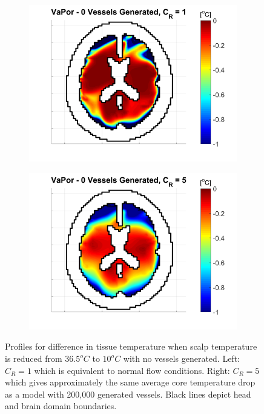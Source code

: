 \documentclass[11pt,english,a4paper,twoside,openright]{report}
\begin{document}
{{{{{{{\begin{figure}[h]
	\centering
	\begin{subfigure}[b]{0.49\textwidth}
		\includegraphics[width=\textwidth]{Chapter5/Chapter5_Section2_Valid1}
	\end{subfigure}
	\begin{subfigure}[b]{0.49\textwidth}
		\includegraphics[width=\textwidth]{Chapter5/Chapter5_Section2_Valid5}
	\end{subfigure}
	\caption[Profiles for difference in tissue temperature after cooling for $C_{R}=1$ and $C_{R}=5$]{Profiles for difference in tissue temperature when scalp temperature is reduced from $36.5^{o}C$ to $10^{o}C$ with no vessels generated. Left: $C_{R}=1$ which is equivalent to normal flow conditions. Right: $C_{R}=5$ which gives approximately the same average core temperature drop as a model with 200,000 generated vessels. Black lines depict head and brain domain boundaries.}
	\label{fig:CounterCurrentResults2}
\end{figure}

}}}}}}}
\end{document}
